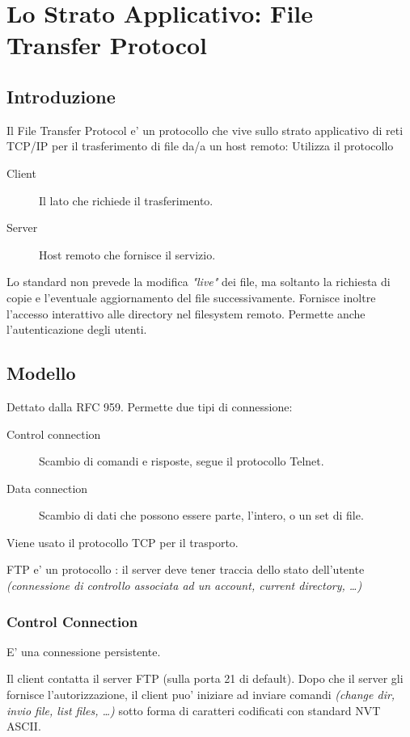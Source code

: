 \chapter{Lo Strato Applicativo: File Transfer Protocol}
\section{Introduzione}
Il File Transfer Protocol  e' un protocollo che vive sullo strato applicativo di reti TCP/IP per il trasferimento di file da/a un host remoto:
Utilizza il protocollo 
\begin{description}
    \item[Client] Il lato che richiede il trasferimento.
    \item[Server] Host remoto che fornisce il servizio. 
\end{description}
Lo standard non prevede la modifica \textit{"live"} dei file, ma soltanto la richiesta di copie e l'eventuale aggiornamento del file successivamente.
Fornisce inoltre l'accesso interattivo alle directory nel filesystem remoto.
Permette anche l'autenticazione degli utenti.
\section{Modello}
Dettato dalla RFC 959. Permette due tipi di connessione:
\begin{description}
    \item[Control connection] Scambio di comandi e risposte, segue il protocollo Telnet.
    \item[Data connection] Scambio di dati che possono essere parte, l'intero, o un set di file.
\end{description}
Viene usato il protocollo TCP per il trasporto.

FTP e' un protocollo : il server deve tener traccia dello stato dell'utente \textit{(connessione di controllo associata ad un account, current directory, \dots)}
\subsection{Control Connection}
E' una connessione persistente.

Il client contatta il server FTP (sulla porta 21 di default). Dopo che il server gli fornisce l'autorizzazione, il client puo' iniziare ad inviare comandi \textit{(change dir, invio file, list files, \dots)} sotto forma di caratteri codificati con standard NVT ASCII.
